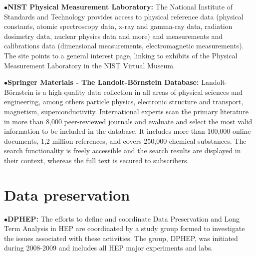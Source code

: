
\medskip

\item{$\bullet$}{\bf NIST Physical Measurement Laboratory:} 
The National Institute of Standards and Technology provides access to physical reference data (physical constants, atomic spectroscopy data, x-ray and gamma-ray data, radiation dosimetry data, nuclear physics data and more) and measurements and calibrations data (dimensional measurements, electromagnetic measurements). The site points to a general interest page, linking to exhibits of the Physical Measurement Laboratory in the NIST Virtual Museum.
	\item{}

\medskip

\item{$\bullet$}{\bf Springer Materials  - The Landolt-B\"ornstein Database:}
Landolt-B\"ornstein is a high-quality data collection in all areas of physical sciences and engineering, among others particle physics, electronic structure and transport, magnetism, superconductivity. International experts scan the primary literature in more than 8,000 peer-reviewed journals and evaluate and select the most valid information to be included in the database. It includes more than 100,000 online documents, 1,2 million references, and covers 250,000 chemical substances.
The search functionality is freely accessible and the search results are displayed in their context, whereas the full text is secured to subscribers.
	\item{}

\medskip


\section{Data preservation}  %

\medskip


\medskip

\item{$\bullet$}{\bf DPHEP:} 
The efforts to define and coordinate Data Preservation and Long Term Analysis in HEP are coordinated by a study group formed to investigate the issues associated with these activities. The group, DPHEP, was initiated during 2008-2009 and includes all HEP major experiments and labs.

